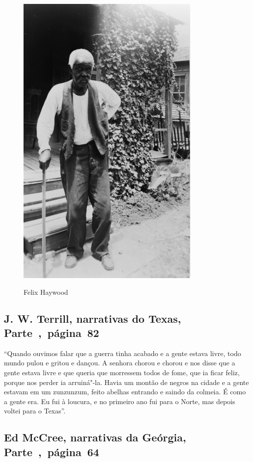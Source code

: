 \begin{figure}[]
\centering
 \includegraphics[width=90mm]{./imgs/felixhaywood_recorte2.jpg} \label{img21}
\caption{Felix Haywood}
\end{figure}

\subsection{J. W. Terrill, narrativas do Texas, Parte~,~página~82}
\label{ref262}

``Quando ouvimos falar que a guerra tinha acabado e a gente estava
livre, todo mundo pulou e gritou e dançou. A senhora chorou e chorou e
nos disse que a gente estava livre e que queria que morressem todos de
fome, que ia ficar feliz, porque nos perder ia arruiná"-la. Havia um
montão de negros na cidade e a gente estavam em um zunzunzum, feito
abelhas entrando e saindo da colmeia. É como a gente era. Eu fui à
loucura, e no primeiro ano fui para o Norte, mas depois voltei para o
Texas''.

\subsection{Ed McCree, narrativas da Geórgia, Parte~,~página~64}
\label{ref187}

